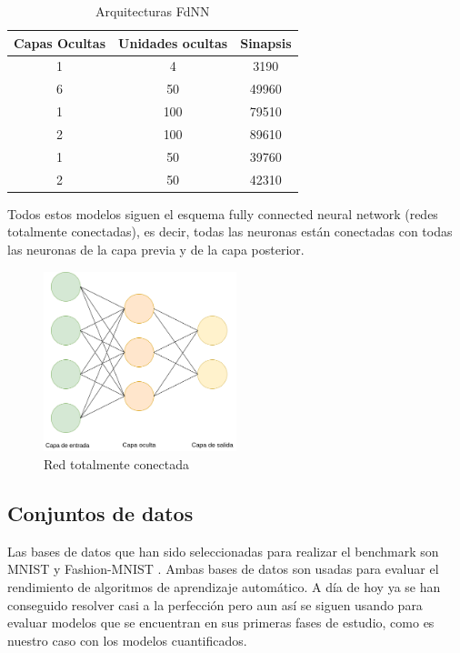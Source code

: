 \begin{table}[H]
    \renewcommand{\arraystretch}{1.5}
    \centering
    \begin{tabular}{ccc}
        \toprule[0.75mm]
        {\textbf{Capas Ocultas}} & \textbf{Unidades ocultas} & \textbf{Sinapsis} \\
        \hline
        1 & 4 & 3190\\
        \hline
        6 & 50 & 49960\\
        \hline
        1 & 100 & 79510\\
        \hline
        2 & 100 & 89610 \\
        \hline
        1 & 50 & 39760 \\
        \hline
        2 & 50 &  42310\\
        \bottomrule[0.75mm]
    \end{tabular}
    \caption{Arquitecturas FdNN}
\end{table}

Todos estos modelos siguen el esquema fully connected neural network (redes totalmente conectadas), es decir, todas las neuronas están conectadas con todas las neuronas de la capa previa y de la capa posterior.


\begin{figure}[H]
\centering
\includegraphics[width=0.5\textwidth]{imagenes/fdnn.drawio.png} 
\caption{Red totalmente conectada}
\end{figure}

\subsection{Conjuntos de datos} \label{conjuntos de datos}

Las bases de datos que han sido seleccionadas para realizar el benchmark son MNIST \cite{7966217} y Fashion-MNIST \cite{DBLP:journals/corr/abs-1708-07747}. Ambas bases de datos son usadas para evaluar el rendimiento de algoritmos de aprendizaje automático. A día de hoy ya se han conseguido resolver casi a la perfección pero aun así se siguen usando para evaluar modelos que se encuentran en sus primeras fases de estudio, como es nuestro caso con los modelos cuantificados.  

